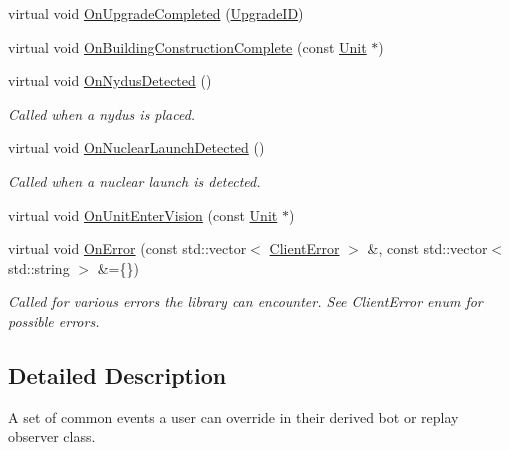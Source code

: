 \begin{DoxyCompactItemize}
\item 
virtual void \hyperlink{classsc2_1_1_client_events_a4cdc022420833b34fbcd1c9713096754}{On\+Upgrade\+Completed} (\hyperlink{classsc2_1_1_s_c2_type}{Upgrade\+ID})
\item 
virtual void \hyperlink{classsc2_1_1_client_events_ad920d34fe6c49487373800dd1ec45757}{On\+Building\+Construction\+Complete} (const \hyperlink{classsc2_1_1_unit}{Unit} $\ast$)
\item 
\mbox{\label{classsc2_1_1_client_events_afde152c65ab94bdb57e345a8fd1532aa}} 
virtual void \hyperlink{classsc2_1_1_client_events_afde152c65ab94bdb57e345a8fd1532aa}{On\+Nydus\+Detected} ()
\begin{DoxyCompactList}\small\item\em Called when a nydus is placed. \end{DoxyCompactList}\item 
\mbox{\label{classsc2_1_1_client_events_ab9923f256e3bf6e518ccb8ec26f8ae88}} 
virtual void \hyperlink{classsc2_1_1_client_events_ab9923f256e3bf6e518ccb8ec26f8ae88}{On\+Nuclear\+Launch\+Detected} ()
\begin{DoxyCompactList}\small\item\em Called when a nuclear launch is detected. \end{DoxyCompactList}\item 
virtual void \hyperlink{classsc2_1_1_client_events_a3d73b5a3462f757397ea5ac2f4aca8dc}{On\+Unit\+Enter\+Vision} (const \hyperlink{classsc2_1_1_unit}{Unit} $\ast$)
\item 
\mbox{\label{classsc2_1_1_client_events_a35424cb2a0baa509f997149521ab2c52}} 
virtual void \hyperlink{classsc2_1_1_client_events_a35424cb2a0baa509f997149521ab2c52}{On\+Error} (const std\+::vector$<$ \hyperlink{sc2__client_8h_ac7d3e3694a208204e099f04c1e5eded0}{Client\+Error} $>$ \&, const std\+::vector$<$ std\+::string $>$ \&=\{\})
\begin{DoxyCompactList}\small\item\em Called for various errors the library can encounter. See Client\+Error enum for possible errors. \end{DoxyCompactList}\end{DoxyCompactItemize}


\subsection{Detailed Description}
A set of common events a user can override in their derived bot or replay observer class. 

